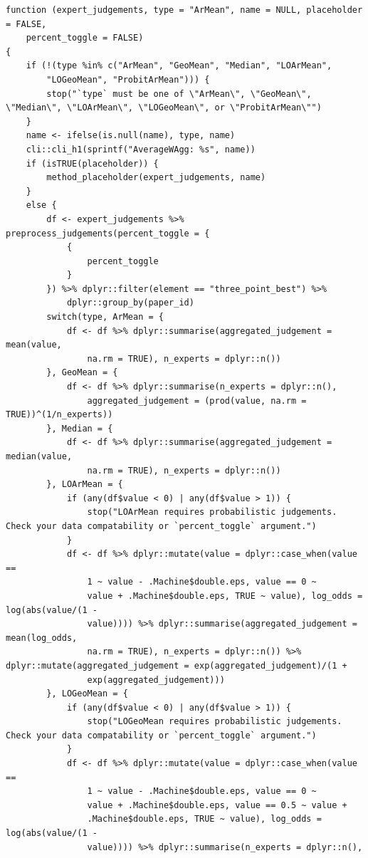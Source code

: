 \documentclass[article]{jss}
\begin{document}
\begin{tcolorbox}[enhanced jigsaw, colback=white, toprule=.15mm, colframe=quarto-callout-color-frame, arc=.35mm, rightrule=.15mm, bottomrule=.15mm, breakable, leftrule=.75mm, left=2mm, opacityback=0]
\begin{verbatim}
function (expert_judgements, type = "ArMean", name = NULL, placeholder = FALSE, 
    percent_toggle = FALSE) 
{
    if (!(type %in% c("ArMean", "GeoMean", "Median", "LOArMean", 
        "LOGeoMean", "ProbitArMean"))) {
        stop("`type` must be one of \"ArMean\", \"GeoMean\", \"Median\", \"LOArMean\", \"LOGeoMean\", or \"ProbitArMean\"")
    }
    name <- ifelse(is.null(name), type, name)
    cli::cli_h1(sprintf("AverageWAgg: %s", name))
    if (isTRUE(placeholder)) {
        method_placeholder(expert_judgements, name)
    }
    else {
        df <- expert_judgements %>% preprocess_judgements(percent_toggle = {
            {
                percent_toggle
            }
        }) %>% dplyr::filter(element == "three_point_best") %>% 
            dplyr::group_by(paper_id)
        switch(type, ArMean = {
            df <- df %>% dplyr::summarise(aggregated_judgement = mean(value, 
                na.rm = TRUE), n_experts = dplyr::n())
        }, GeoMean = {
            df <- df %>% dplyr::summarise(n_experts = dplyr::n(), 
                aggregated_judgement = (prod(value, na.rm = TRUE))^(1/n_experts))
        }, Median = {
            df <- df %>% dplyr::summarise(aggregated_judgement = median(value, 
                na.rm = TRUE), n_experts = dplyr::n())
        }, LOArMean = {
            if (any(df$value < 0) | any(df$value > 1)) {
                stop("LOArMean requires probabilistic judgements. Check your data compatability or `percent_toggle` argument.")
            }
            df <- df %>% dplyr::mutate(value = dplyr::case_when(value == 
                1 ~ value - .Machine$double.eps, value == 0 ~ 
                value + .Machine$double.eps, TRUE ~ value), log_odds = log(abs(value/(1 - 
                value)))) %>% dplyr::summarise(aggregated_judgement = mean(log_odds, 
                na.rm = TRUE), n_experts = dplyr::n()) %>% dplyr::mutate(aggregated_judgement = exp(aggregated_judgement)/(1 + 
                exp(aggregated_judgement)))
        }, LOGeoMean = {
            if (any(df$value < 0) | any(df$value > 1)) {
                stop("LOGeoMean requires probabilistic judgements. Check your data compatability or `percent_toggle` argument.")
            }
            df <- df %>% dplyr::mutate(value = dplyr::case_when(value == 
                1 ~ value - .Machine$double.eps, value == 0 ~ 
                value + .Machine$double.eps, value == 0.5 ~ value + 
                .Machine$double.eps, TRUE ~ value), log_odds = log(abs(value/(1 - 
                value)))) %>% dplyr::summarise(n_experts = dplyr::n(), 

\end{verbatim}
\end{tcolorbox}
\end{document}
